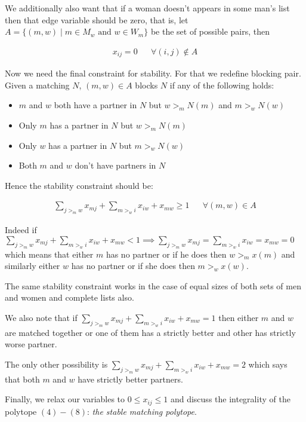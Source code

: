 \documentclass[a4paper,UKenglish,cleveref, autoref]{lipics-v2019}
\theoremstyle{definition}
\begin{document}
We additionally also want that if a woman doesn't appears in some man's list then that edge variable should be zero, that is, let $A = \{(m,w) \mid m \in M_w \text{ and } w \in W_m\}$ be the set of possible pairs, then

\begin{align}
    x_{ij} = 0 && \forall (i,j) \not \in A
\end{align}

Now we need the final constraint for stability. For that we redefine blocking pair. Given a matching $N$, $(m,w) \in A$ blocks $N$ if any of the following holds:
\begin{itemize}
    \item $m$ and $w$ both have a partner in $N$ but $w >_m N(m)$ and $m >_w N(w)$
    \item Only $m$ has a partner in $N$ but $w >_m N(m)$
    \item Only $w$ has a partner in $N$ but $m >_w N(w)$
    \item Both $m$ and $w$ don't have partners in $N$
\end{itemize}

Hence the stability constraint should be:

\begin{align}
    \sum_{j >_m w} x_{mj} + \sum_{m >_ w i} x_{iw} + x_{mw} \geq 1 && \forall (m,w) \in A
\end{align}

Indeed if $\sum_{j >_m w} x_{mj} + \sum_{m >_ w i} x_{iw} + x_{mw} < 1 \implies \sum_{j >_m w} x_{mj} = \sum_{m >_ w i} x_{iw} = x_{mw} = 0$ which means that either $m$ has no partner or if he does then $w >_m x(m)$ and similarly either $w$ has no partner or if she does then $m >_w x(w)$.

\begin{remark*}
The same stability constraint works in the case of equal sizes of both sets of men and women and complete lists also.
\end{remark*}

We also note that if $\sum_{j >_m w} x_{mj} + \sum_{m >_ w i} x_{iw} + x_{mw} = 1$ then either $m$ and $w$ are matched together or one of them has a strictly better and other has strictly worse partner.

The only other possibility is $\sum_{j >_m w} x_{mj} + \sum_{m >_ w i} x_{iw} + x_{mw} = 2$ which says that both $m$ and $w$ have strictly better partners.
\newline

Finally, we relax our variables to $0 \leq x_{ij} \leq 1$ and discuss the integrality of the polytope $(4)-(8)$: \textsl{the stable matching polytope}.
\end{document}
